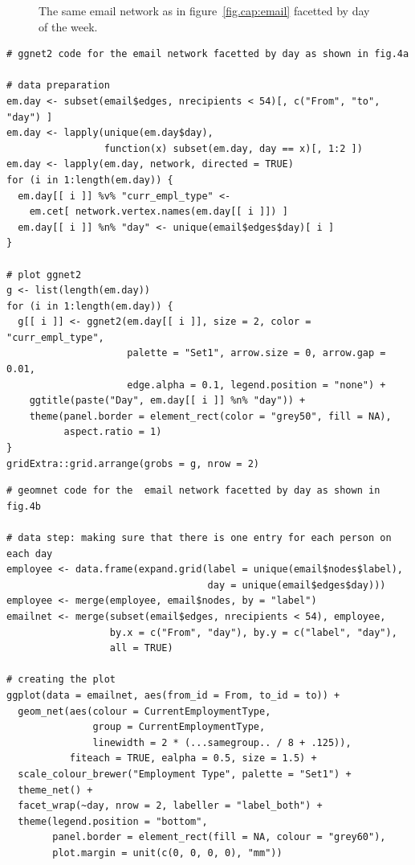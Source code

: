 \begin{figure}[hbt]
\caption{\label{fig:email_facet} The same email network as in figure~\ref{fig.cap:email} facetted by day of the week.}
\end{figure}
\afterpage{\clearpage}
\begin{knitrout}
\color{fgcolor}\begin{kframe}
\begin{verbatim}
# ggnet2 code for the email network facetted by day as shown in fig.4a

# data preparation
em.day <- subset(email$edges, nrecipients < 54)[, c("From", "to", "day") ]
em.day <- lapply(unique(em.day$day),
                 function(x) subset(em.day, day == x)[, 1:2 ])
em.day <- lapply(em.day, network, directed = TRUE)
for (i in 1:length(em.day)) {
  em.day[[ i ]] %v% "curr_empl_type" <-
    em.cet[ network.vertex.names(em.day[[ i ]]) ]
  em.day[[ i ]] %n% "day" <- unique(email$edges$day)[ i ]
}

# plot ggnet2
g <- list(length(em.day))
for (i in 1:length(em.day)) {
  g[[ i ]] <- ggnet2(em.day[[ i ]], size = 2, color = "curr_empl_type",
                     palette = "Set1", arrow.size = 0, arrow.gap = 0.01,
                     edge.alpha = 0.1, legend.position = "none") +
    ggtitle(paste("Day", em.day[[ i ]] %n% "day")) +
    theme(panel.border = element_rect(color = "grey50", fill = NA),
          aspect.ratio = 1)
}
gridExtra::grid.arrange(grobs = g, nrow = 2)
\end{verbatim}
\end{kframe}
\end{knitrout}

\begin{knitrout}
\color{fgcolor}\begin{kframe}
\begin{verbatim}
# geomnet code for the  email network facetted by day as shown in fig.4b

# data step: making sure that there is one entry for each person on each day
employee <- data.frame(expand.grid(label = unique(email$nodes$label),
                                   day = unique(email$edges$day)))
employee <- merge(employee, email$nodes, by = "label")
emailnet <- merge(subset(email$edges, nrecipients < 54), employee,
                  by.x = c("From", "day"), by.y = c("label", "day"),
                  all = TRUE)

# creating the plot
ggplot(data = emailnet, aes(from_id = From, to_id = to)) +
  geom_net(aes(colour = CurrentEmploymentType,
               group = CurrentEmploymentType,
               linewidth = 2 * (...samegroup.. / 8 + .125)),
           fiteach = TRUE, ealpha = 0.5, size = 1.5) +
  scale_colour_brewer("Employment Type", palette = "Set1") +
  theme_net() +
  facet_wrap(~day, nrow = 2, labeller = "label_both") +
  theme(legend.position = "bottom",
        panel.border = element_rect(fill = NA, colour = "grey60"),
        plot.margin = unit(c(0, 0, 0, 0), "mm"))
\end{verbatim}
\end{kframe}
\end{knitrout}

